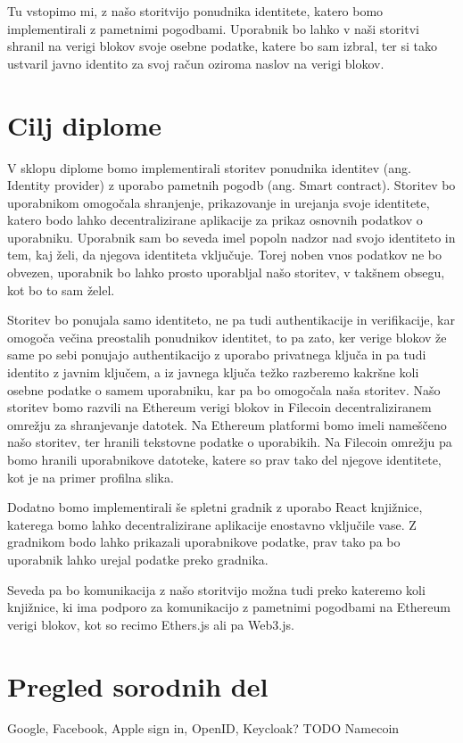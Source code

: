 \documentclass[a4paper,12pt,openright]{book}
\begin{document}
Tu vstopimo mi, z našo storitvijo ponudnika identitete, katero bomo implementirali z pametnimi pogodbami.
Uporabnik bo lahko v naši storitvi shranil na verigi blokov svoje osebne podatke, katere bo sam izbral, 
ter si tako ustvaril javno identito za svoj račun oziroma naslov na verigi blokov.

\section{Cilj diplome}
V sklopu diplome bomo implementirali storitev ponudnika identitev (ang. Identity provider) z uporabo pametnih pogodb (ang. Smart contract).
Storitev bo uporabnikom omogočala shranjenje, prikazovanje in urejanja svoje identitete, katero bodo lahko decentralizirane aplikacije za prikaz osnovnih podatkov o uporabniku.
Uporabnik sam bo seveda imel popoln nadzor nad svojo identiteto in tem, kaj želi, da njegova identiteta vključuje.
Torej noben vnos podatkov ne bo obvezen, uporabnik bo lahko prosto uporabljal našo storitev, v takšnem obsegu, kot bo to sam želel.

Storitev bo ponujala samo identiteto, ne pa tudi authentikacije in verifikacije, kar omogoča večina preostalih ponudnikov identitet, to pa zato, 
ker verige blokov že same po sebi ponujajo authentikacijo z uporabo privatnega ključa in pa tudi identito z javnim ključem, 
a iz javnega ključa težko razberemo kakršne koli osebne podatke o samem uporabniku, kar pa bo omogočala naša storitev.
Našo storitev bomo razvili na Ethereum verigi blokov in Filecoin decentraliziranem omrežju za shranjevanje datotek.
Na Ethereum platformi bomo imeli nameščeno našo storitev, ter hranili tekstovne podatke o uporabikih.
Na Filecoin omrežju pa bomo hranili uporabnikove datoteke, katere so prav tako del njegove identitete, kot je na primer profilna slika.

Dodatno bomo implementirali še spletni gradnik z uporabo React knjižnice, katerega bomo lahko decentralizirane aplikacije enostavno vključile vase.
Z gradnikom bodo lahko prikazali uporabnikove podatke, prav tako pa bo uporabnik lahko urejal podatke preko gradnika.

Seveda pa bo komunikacija z našo storitvijo možna tudi preko kateremo koli knjižnice, ki ima podporo za komunikacijo z pametnimi pogodbami na Ethereum verigi blokov, kot so recimo Ethers.js ali pa Web3.js.

\section{Pregled sorodnih del}
Google, Facebook, Apple sign in, OpenID, Keycloak?
TODO
Namecoin
\end{document}
